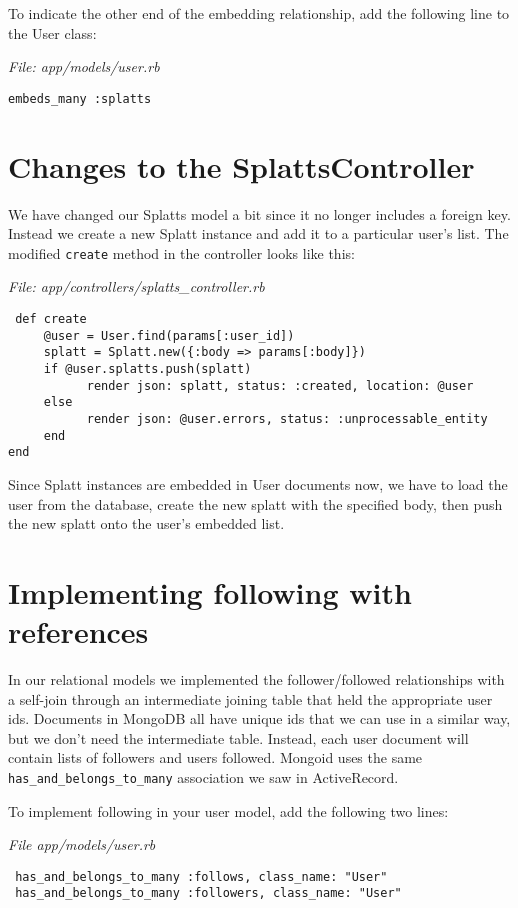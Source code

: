\documentclass{article}
\begin{document}
\newpage

To indicate the other end of the embedding relationship, add the following line to the User class:

\emph{File: app/models/user.rb}

\texttt{embeds\_many :splatts}

\section{Changes to the SplattsController}
We have changed our Splatts model a bit since it no longer includes a foreign key.  Instead we create a new Splatt instance and add it to a particular user's list.  The modified \texttt{create} method in the controller looks like this:

\emph{File: app/controllers/splatts\_controller.rb}

\begin{verbatim}
 def create
     @user = User.find(params[:user_id])
     splatt = Splatt.new({:body => params[:body]})
     if @user.splatts.push(splatt)
           render json: splatt, status: :created, location: @user
     else
           render json: @user.errors, status: :unprocessable_entity
     end
end
\end{verbatim}

Since Splatt instances are embedded in User documents now, we have to load the user from the database, create the new splatt with the specified body, then push the new splatt onto the user's embedded list.

\section{Implementing following with references}
In our relational models we implemented the follower/followed relationships with a self-join through an intermediate joining table that held the appropriate user ids.  Documents in MongoDB all have unique ids that we can use in a similar way, but we don't need the intermediate table.  Instead, each user document will contain lists of followers and users followed.  Mongoid uses the same \texttt{has\_and\_belongs\_to\_many} association we saw in ActiveRecord.

To implement following in your user model, add the following two lines:

\emph{File app/models/user.rb}

\begin{verbatim}
 has_and_belongs_to_many :follows, class_name: "User"
 has_and_belongs_to_many :followers, class_name: "User"
\end{verbatim}
\end{document}
